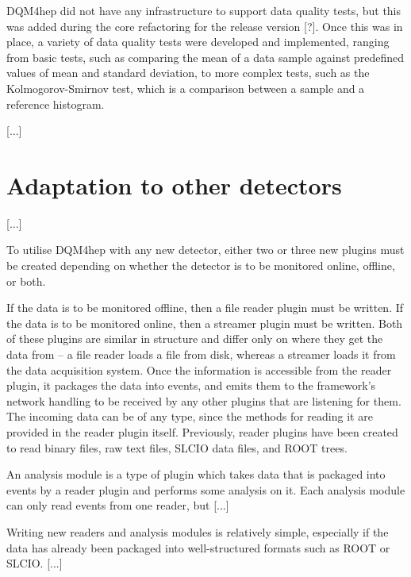 DQM4hep did not have any infrastructure to support data quality tests, but this was added during the core refactoring for the release version [?]. Once this was in place, a variety of data quality tests were developed and implemented, ranging from basic tests, such as comparing the mean of a data sample against predefined values of mean and standard deviation, to more complex tests, such as the Kolmogorov-Smirnov test, which is a comparison between a sample and a reference histogram.


[...]

\section{Adaptation to other detectors}

[...]

To utilise DQM4hep with any new detector, either two or three new plugins must be created depending on whether the detector is to be monitored online, offline, or both.

If the data is to be monitored offline, then a file reader plugin must be written. If the data is to be monitored online, then a streamer plugin must be written. Both of these plugins are similar in structure and differ only on where they get the data from -- a file reader loads a file from disk, whereas a streamer loads it from the data acquisition system. Once the information is accessible from the reader plugin, it packages the data into events, and emits them to the framework's network handling to be received by any other plugins that are listening for them. The incoming data can be of any type, since the methods for reading it are provided in the reader plugin itself. Previously, reader plugins have been created to read binary files, raw text files, SLCIO data files, and ROOT trees.

An analysis module is a type of plugin which takes data that is packaged into events by a reader plugin and performs some analysis on it. Each analysis module can only read events from one reader, but [...] 

Writing new readers and analysis modules is relatively simple, especially if the data has already been packaged into well-structured formats such as ROOT or SLCIO. [...]


